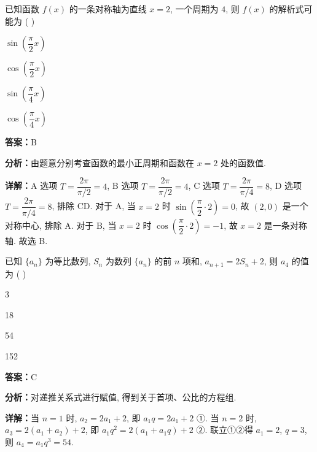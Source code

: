 \begin{question}[points=5]
已知函数 $f(x)$ 的一条对称轴为直线 $x = 2$, 一个周期为 $4$, 则 $f(x)$ 的解析式可能为 ( )
\begin{choices}
  \item $\sin\left(\dfrac{\pi}{2}x\right)$
  \item $\cos\left(\dfrac{\pi}{2}x\right)$
  \item $\sin\left(\dfrac{\pi}{4}x\right)$
  \item $\cos\left(\dfrac{\pi}{4}x\right)$
\end{choices}
\begin{solution}
\textbf{答案：}B

\textbf{分析：}由题意分别考查函数的最小正周期和函数在 $x=2$ 处的函数值.

\textbf{详解：}A 选项 $T = \dfrac{2\pi}{\pi/2} = 4$, B 选项 $T = \dfrac{2\pi}{\pi/2} = 4$, C 选项 $T = \dfrac{2\pi}{\pi/4} = 8$, D 选项 $T = \dfrac{2\pi}{\pi/4} = 8$, 排除 CD. 对于 A, 当 $x=2$ 时 $\sin\left(\dfrac{\pi}{2}\cdot 2\right)=0$, 故 $(2,0)$ 是一个对称中心, 排除 A. 对于 B, 当 $x=2$ 时 $\cos\left(\dfrac{\pi}{2}\cdot 2\right) = -1$, 故 $x=2$ 是一条对称轴. 故选 B.
\end{solution}
\end{question}

\begin{question}[points=5]
已知 $\{a_n\}$ 为等比数列, $S_n$ 为数列 $\{a_n\}$ 的前 $n$ 项和, $a_{n+1} = 2S_n + 2$, 则 $a_4$ 的值为 ( )
\begin{choices}
  \item 3
  \item 18
  \item 54
  \item 152
\end{choices}
\begin{solution}
\textbf{答案：}C

\textbf{分析：}对递推关系式进行赋值, 得到关于首项、公比的方程组.

\textbf{详解：}当 $n=1$ 时, $a_2 = 2a_1 + 2$, 即 $a_1 q = 2a_1 + 2$ ①. 当 $n=2$ 时, $a_3 = 2(a_1 + a_2) + 2$, 即 $a_1 q^2 = 2(a_1 + a_1 q) + 2$ ②. 联立①②得 $a_1 = 2$, $q = 3$, 则 $a_4 = a_1 q^3 = 54$.
\end{solution}
\end{question}

